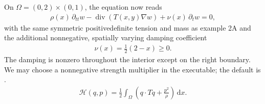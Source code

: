 \documentclass[letterpaper,10pt,english]{sphinxmanual}
\begin{document}
\sphinxAtStartPar
On \(\Omega=(0,2)\times(0,1)\), the equation now reads
\begin{equation*}
\begin{split}\rho(x)\,\partial_{tt}w
-\operatorname{div}(T(x,y)\nabla w)
+\nu(x)\,\partial_t w=0,\end{split}
\end{equation*}
\sphinxAtStartPar
with the same symmetric positive\sphinxhyphen{}definite tension and mass as
example 2A and the additional nonnegative, spatially varying
damping coefficient
\begin{equation*}
\begin{split}\nu(x)=\tfrac12(2-x)\geq0.\end{split}
\end{equation*}
\sphinxAtStartPar
The damping is nonzero throughout the interior except on the
right boundary. We may choose a nonnegative strength multiplier
in the executable; the default is .
\begin{equation*}
\begin{split}\mathcal H(q,p)=\tfrac12\int_\Omega
\left(q\cdot Tq+\frac{p^2}{\rho}\right)\,\mathrm dx.\end{split}
\end{equation*}
\end{document}
